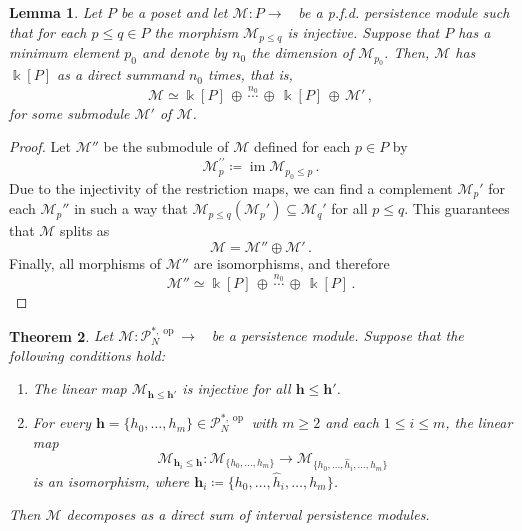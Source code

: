 \documentclass[reqno,12pt]{amsart}
\newcommand{\cM}{\mathcal{M}}
\newcommand{\cP}{\mathcal{P}}
\DeclareMathOperator{\vect}{\mathbf{vect}_\Bbbk}
\DeclareMathOperator{\img}{im}
\DeclareMathOperator{\op}{op}
\newcommand{\0}{\mathbf 0}
\newcommand{\h}{\mathbf{h}}
\newtheorem{theorem}{Theorem}[section]
\newtheorem{lemma}[theorem]{Lemma}
\theoremstyle{definition}
\begin{document}
\begin{lemma}\label{Lem:DecompositionMinimalInjectives}
    Let $P$ be a poset and let $\cM\colon P\to \vect$ be a p.f.d. persistence module such that for each $p\leq q \in P$ the morphism $\cM_{p\leq q}$ is injective. Suppose that $P$ has a minimum element $p_0$ and denote by $n_0$ the dimension of $\cM_{p_0}$.
    Then, $\cM$ has $\Bbbk[P]$ as a direct summand $n_0$ times, that is,
    \[
    \cM\simeq \Bbbk[P] \,\oplus\, \stackrel{n_0}{\cdots}\,\oplus\, \Bbbk[P] \, \oplus \, \cM'\, ,
    \]
    for some submodule $\cM'$ of $\cM$.
\end{lemma}
\begin{proof}
    Let $\cM''$ be the submodule of $\cM$ defined for each $p\in P$ by
    \[
    \cM_p^{\prime\prime}\coloneqq \img \cM_{p_0\leq p}\, .
    \]
    Due to the injectivity of the restriction maps, we can find a complement $\cM_p'$ for each $\cM_p''$ in such a way that $\cM_{p\leq q}(\cM_p') \subseteq \cM_q'$ for all $p\leq q$. This guarantees that $\cM$ splits as 
    \[
    \cM= \cM''\oplus \cM'\,.
    \]
    Finally, all morphisms of $\cM''$ are isomorphisms, and therefore
    \[
    \cM''\simeq \Bbbk[P] \,\oplus\, \stackrel{n_0}\cdots\,\oplus\, \Bbbk[P]\,.
    \]
\end{proof}

\begin{theorem}\label{Thm:DecompositionN}
    Let $\cM\colon\cP^{*,\op}_N\longrightarrow \vect$ be a persistence module. Suppose that the following conditions hold:
    \begin{enumerate}
        \item The linear map $\cM_{\h\leq \h'}$ is injective for all $\h\leq \h'$.
        \item For every $\h=\{h_0,\dots,h_m\}\in \cP^{*,\op}_N$ with $m\geq 2$ and each $1\leq i\leq m$, the linear map 
        \[
            \cM_{\h_i\leq\h}\colon \cM_{\{h_0,\dots,h_m\}}\longrightarrow \cM_{\{h_0,\dots,\widehat{h}_i,\dots,h_m\}}
        \]
        is an isomorphism, where $\h_i\coloneqq\{h_0,\dots,\widehat{h}_i,\dots,h_m\}$.
    \end{enumerate}
    Then $\cM$ decomposes as a direct sum of interval persistence modules.
\end{theorem}
\end{document}
